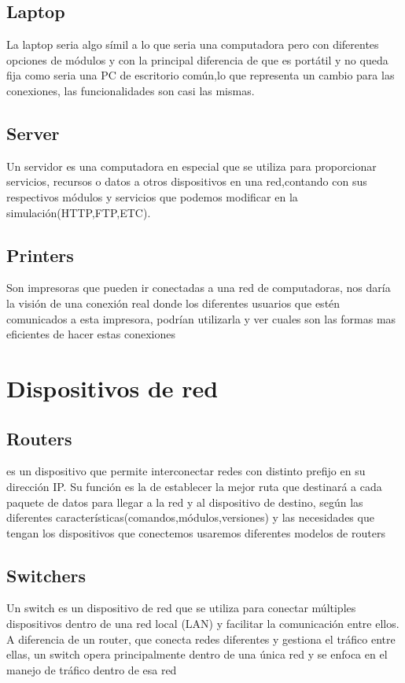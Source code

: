 \documentclass{article}
\begin{document}
\subsection{Laptop}
La laptop seria algo símil a lo que seria una computadora pero con diferentes opciones de módulos y con la principal diferencia de que es portátil y no queda fija como seria una PC de escritorio común,lo que representa un cambio para las conexiones, las funcionalidades son casi las mismas.
\subsection{Server}
Un servidor  es una computadora en especial que se utiliza para proporcionar servicios, recursos o datos a otros dispositivos en una red,contando con sus respectivos módulos y servicios que podemos modificar en la simulación(HTTP,FTP,ETC). 
\subsection{Printers}
Son impresoras que pueden ir conectadas a una red de computadoras, nos daría la visión de una conexión real donde los diferentes usuarios que estén comunicados a esta impresora, podrían utilizarla y ver cuales son las formas mas eficientes de hacer estas conexiones 

\section{Dispositivos de red}
\subsection{Routers}
es un dispositivo que permite interconectar redes con distinto prefijo en su dirección IP. Su función es la de establecer la mejor ruta que destinará a cada paquete de datos para llegar a la red y al dispositivo de destino, según las diferentes características(comandos,módulos,versiones) y las necesidades que tengan los dispositivos que conectemos usaremos diferentes modelos de routers

\subsection{Switchers}
Un switch es un dispositivo de red que se utiliza para conectar múltiples dispositivos dentro de una red local (LAN) y facilitar la comunicación entre ellos. A diferencia de un router, que conecta redes diferentes y gestiona el tráfico entre ellas, un switch opera principalmente dentro de una única red y se enfoca en el manejo de tráfico dentro de esa red 
\end{document}
